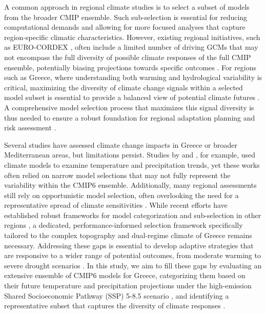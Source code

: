 \documentclass[pdflatex,sn-chicago]{sn-jnl}%
\theoremstyle{thmstyleone}%
\theoremstyle{thmstyletwo}%
\theoremstyle{thmstylethree}%
\begin{document}
A common approach in regional climate studies is to select a subset of models from the broader CMIP ensemble. Such sub-selection is essential for reducing computational demands and allowing for more focused analyses that capture region-specific climatic characteristics. However, existing regional initiatives, such as EURO-CORDEX \citep{Jacob2013,euro-cordex}, often include a limited number of driving GCMs that may not encompass the full diversity of possible climate responses of the full CMIP ensemble, potentially biasing projections towards specific outcomes \citep{Mesta2021, Brogli2021}. For regions such as Greece, where understanding both warming and hydrological variability is critical, maximizing the diversity of climate change signals within a selected model subset is essential to provide a balanced view of potential climate futures \citep{Allam2020, Arjdal2023}. A comprehensive model selection process that maximizes this signal diversity is thus needed to ensure a robust foundation for regional adaptation planning and risk assessment \citep{Coppola2020, Seker2022}.

Several studies have assessed climate change impacts in Greece or broader Mediterranean areas, but limitations persist. Studies by \citet{Katopodis2021} and \citet{Giuntoli2020}, for example, used climate models to examine temperature and precipitation trends, yet these works often relied on narrow model selections that may not fully represent the variability within the CMIP6 ensemble. Additionally, many regional assessments still rely on opportunistic model selection, often overlooking the need for a representative spread of climate sensitivities \citep{Conte2020, Kim2020}. While recent efforts have established robust frameworks for model categorization and sub-selection in other regions \citep{Ruosteenoja2021, Hausfather2022, Nolan2023}, a dedicated, performance-informed selection framework specifically tailored to the complex topography and dual-regime climate of Greece remains necessary. Addressing these gaps is essential to develop adaptive strategies that are responsive to a wider range of potential outcomes, from moderate warming to severe drought scenarios \citep{Mesta2021, Arjdal2023}. In this study, we aim to fill these gaps by evaluating an extensive ensemble of CMIP6 models for Greece, categorizing them based on their future temperature and precipitation projections under the high-emission Shared Socioeconomic Pathway (SSP) 5-8.5 scenario \citep{ONeill2016}, and identifying a representative subset that captures the diversity of climate responses \citep{Seker2022, Coppola2020}.
\end{document}
